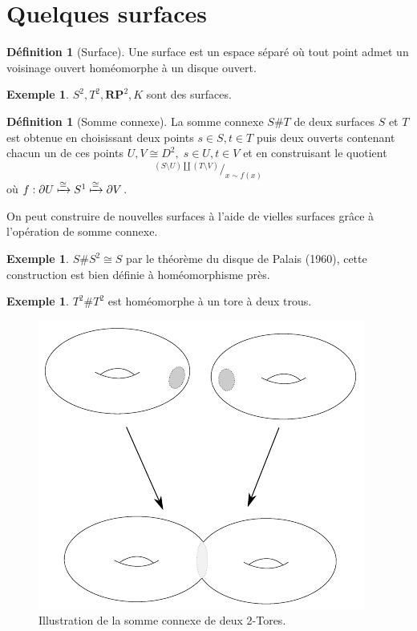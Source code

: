 \documentclass[12pt]{book}
\theoremstyle{definition}
\newtheorem{definition}[lemma]{Définition}
\newtheorem{example}[lemma]{Exemple}
\theoremstyle{remark}
\newcommand*\quot[2]{{^{\textstyle #1}\big/_{\textstyle #2}}}
\begin{document}
	\section{Quelques surfaces}
	\begin{definition}[Surface]
		Une surface est un espace séparé où tout point admet un voisinage ouvert homéomorphe à un disque ouvert.	
	\end{definition}
	\begin{example}
		$S^2, T^2, \mathbf{RP}^2, K$ sont des surfaces. 
	\end{example}
	\begin{definition}[Somme connexe]
		La somme connexe $S\#T$ de deux surfaces $S$ et $T$ est obtenue en choisissant deux points $s \in S, t \in T$ puis deux ouverts contenant chacun un de ces points $U, V \cong D^2, \; s \in U, t \in V$ et en construisant le quotient \[
			\quot{(S\setminus U)\coprod (T \setminus V)}{x\sim f(x)}
		\] 
			où $f : \partial U \xmapsto{\cong} S^1 \xmapsto{\cong} \partial V$.
	\end{definition}
	On peut construire de nouvelles surfaces à l'aide de vielles surfaces grâce à l'opération de somme connexe.
	\begin{example}
		$S\#S^2 \cong S$ par le théorème du disque de Palais (1960), cette construction est bien définie à homéomorphisme près.
	\end{example}
	\begin{example}
		$T^2\#T^2$ est homéomorphe à un tore à deux trous.
	\end{example}

	\begin{figure}[ht]
			\centering
			\includegraphics{connectedsum.pdf}
			\caption{Illustration de la somme connexe de deux 2-Tores.}
	\end{figure}
\end{document}
